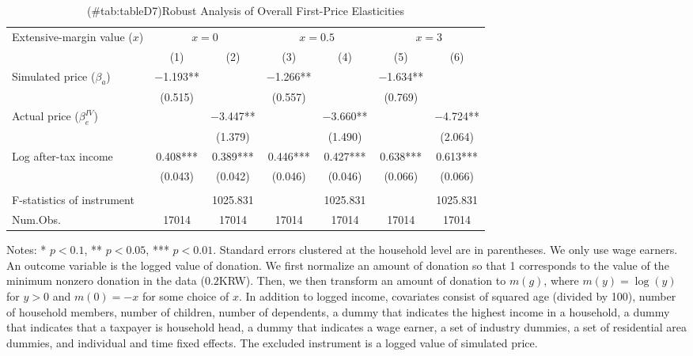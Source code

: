 \begin{table}

\caption{(\#tab:tableD7)Robust Analysis of Overall First-Price Elasticities\label{tab:ext-margin-value}}
\centering
\fontsize{8}{10}\selectfont
\begin{threeparttable}
\begin{tabular}[t]{lcccccc}
\toprule
\multicolumn{1}{c}{Extensive-margin value ($x$)} & \multicolumn{2}{c}{$x = 0$} & \multicolumn{2}{c}{$x = 0.5$} & \multicolumn{2}{c}{$x = 3$} \\
\cmidrule(l{3pt}r{3pt}){1-1} \cmidrule(l{3pt}r{3pt}){2-3} \cmidrule(l{3pt}r{3pt}){4-5} \cmidrule(l{3pt}r{3pt}){6-7}
  & (1) & (2) & (3) & (4) & (5) & (6)\\
\midrule
Simulated price ($\beta_a$) & \num{-1.193}** &  & \num{-1.266}** &  & \num{-1.634}** & \\
 & (\num{0.515}) &  & (\num{0.557}) &  & (\num{0.769}) & \\
Actual price ($\beta^{IV}_e$) &  & \num{-3.447}** &  & \num{-3.660}** &  & \num{-4.724}**\\
 &  & (\num{1.379}) &  & (\num{1.490}) &  & (\num{2.064})\\
Log after-tax income & \num{0.408}*** & \num{0.389}*** & \num{0.446}*** & \num{0.427}*** & \num{0.638}*** & \num{0.613}***\\
 & (\num{0.043}) & (\num{0.042}) & (\num{0.046}) & (\num{0.046}) & (\num{0.066}) & (\num{0.066})\\
\midrule
\addlinespace[0.3em]
\multicolumn{7}{l}{\textit{1st stage information (Excluded instrument: Simulated price)}}\\
\hspace{1em}F-statistics of instrument &  & \num{1025.831} &  & \num{1025.831} &  & \num{1025.831}\\
Num.Obs. & \num{17014} & \num{17014} & \num{17014} & \num{17014} & \num{17014} & \num{17014}\\
\bottomrule
\end{tabular}
\begin{tablenotes}
\item Notes: * $p < 0.1$, ** $p < 0.05$, *** $p < 0.01$. Standard errors clustered at the household level are in parentheses. We only use wage earners. An outcome variable is the logged value of donation. We first normalize an amount of donation so that 1 corresponds to the value of the minimum nonzero donation in the data ($0.2$KRW). Then, we then transform an amount of donation to $m(g)$, where $m(y) = \log(y)$ for $y > 0$ and $m(0) = -x$ for some choice of $x$. In addition to logged income, covariates consist of squared age (divided by 100), number of household members, number of children, number of dependents, a dummy that indicates the highest income in a household, a dummy that indicates that a taxpayer is household head, a dummy that indicates a wage earner, a set of industry dummies, a set of residential area dummies, and individual and time fixed effects. The excluded instrument is a logged value of simulated price.
\end{tablenotes}
\end{threeparttable}
\end{table}
